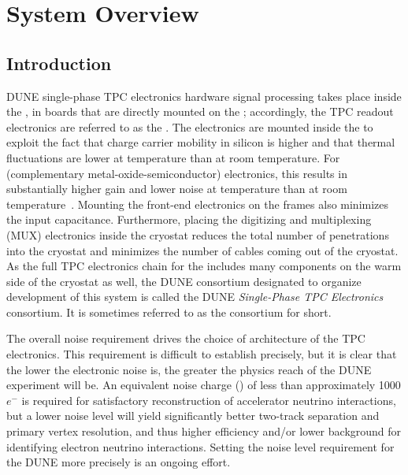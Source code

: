 \section{System Overview}
\label{sec:fdsp-tpcelec-overview}


\subsection{Introduction}
\label{sec:fdsp-tpcelec-overview-intro}

DUNE single-phase TPC electronics hardware signal processing takes place inside the \lar, in boards that are directly mounted on the ; accordingly, the TPC readout electronics are referred to as the .  The electronics are mounted inside the \lar to exploit the fact that charge carrier mobility in silicon is higher and that thermal fluctuations are lower at \lar temperature than at room temperature.  For  (complementary metal-oxide-semiconductor) electronics, this results in substantially higher gain and lower noise at \lar temperature than at room temperature~\cite{larCMOS}.  Mounting the front-end electronics on the  frames also minimizes the input capacitance.  Furthermore, placing the digitizing and multiplexing (MUX) electronics inside the cryostat reduces the total number of penetrations into the cryostat and minimizes the number of cables coming out of the cryostat.  As the full TPC electronics chain for the  includes many components on the warm side of the cryostat as well, the DUNE consortium designated to organize development of this system is called the DUNE \textit{Single-Phase TPC Electronics} consortium. It is sometimes referred to as the  consortium for short.

The overall noise requirement drives the choice of architecture of the TPC electronics. This requirement is difficult to establish precisely, but it is clear that the lower the electronic noise is, the greater the physics reach of the DUNE experiment will be.  An equivalent noise charge () of less than approximately 1000$e^-$ is required for satisfactory reconstruction of accelerator neutrino interactions, but a lower noise level will yield significantly better two-track separation and primary vertex resolution, and thus higher efficiency and/or lower background for identifying electron neutrino interactions.  Setting the noise level requirement for the DUNE  more precisely is an ongoing effort.

